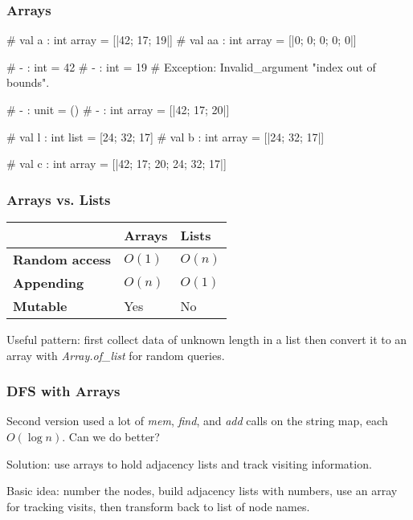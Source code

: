 \documentclass{plt}
\begin{document}
\begin{frame}[fragile]
  \frametitle{Arrays}

\begin{interactive}
# 
val a : int array = [|42; 17; 19|]
# 
val aa : int array = [|0; 0; 0; 0; 0|]

# 
- : int = 42
# 
- : int = 19
# 
Exception: Invalid_argument "index out of bounds".

# 
- : unit = ()
# 
- : int array = [|42; 17; 20|]

# 
val l : int list = [24; 32; 17]
# 
val b : int array = [|24; 32; 17|]

# 
val c : int array = [|42; 17; 20; 24; 32; 17|]
\end{interactive}

\end{frame}

\begin{frame}
  \frametitle{Arrays vs. Lists}

  \begin{center}
    \begin{tabular}{lll}
\toprule
& \textbf{Arrays} & \textbf{Lists} \\
\midrule
\textbf{Random access} & $O(1)$ & $O(n)$ \\
\textbf{Appending} & $O(n)$ & $O(1)$ \\
\textbf{Mutable} & Yes & No \\
\bottomrule
    \end{tabular}
  \end{center}

\medskip

Useful pattern: first collect data of unknown length in a list then
convert it to an array with \emph{Array.of\_list} for random queries.

\end{frame}

\begin{frame}
  \frametitle{DFS with Arrays}

Second version used a lot of \emph{mem}, \emph{find}, and \emph{add}
calls on the string map, each $O(\log n)$.  Can we do better?

Solution: use arrays to hold adjacency lists and track visiting
information.

Basic idea: number the nodes, build adjacency lists with numbers, use
an array for tracking visits, then transform back to list of node names.

\end{frame}
\end{document}
